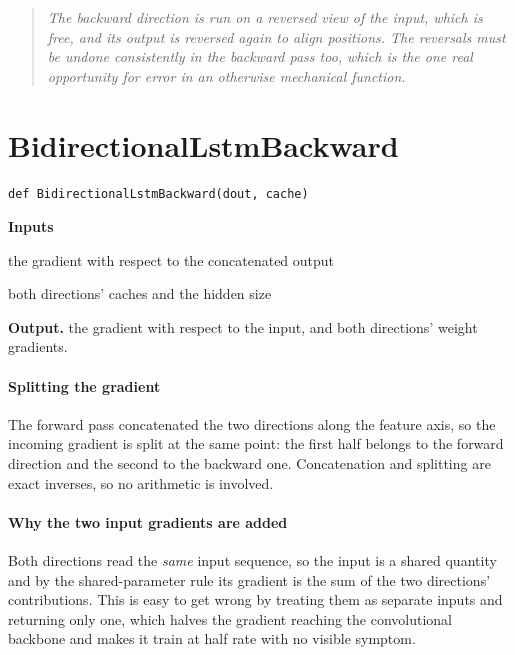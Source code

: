 \begin{quote}\small\itshape The backward direction is run on a reversed view of the input, which is free, and its output is reversed again to align positions. The reversals must be undone consistently in the backward pass too, which is the one real opportunity for error in an otherwise mechanical function.\end{quote}

\section{BidirectionalLstmBackward}
\begin{lstlisting}[style=sig]
def BidirectionalLstmBackward(dout, cache)
\end{lstlisting}

\noindent\textbf{Inputs}
\begin{description}[leftmargin=2.2em,style=nextline,font=\normalfont\ttfamily]\setlength\itemsep{1pt}
  \item[{dout}] \normalfont the gradient with respect to the concatenated output
  \item[{cache}] \normalfont both directions' caches and the hidden size
\end{description}

\noindent\textbf{Output.} the gradient with respect to the input, and both directions' weight gradients.


\paragraph{Splitting the gradient}
The forward pass concatenated the two directions along the feature axis, so the incoming gradient is split at the same point: the first half belongs to the forward direction and the second to the backward one. Concatenation and splitting are exact inverses, so no arithmetic is involved.


\paragraph{Why the two input gradients are added}
Both directions read the \emph{same} input sequence, so the input is a shared quantity and by the shared-parameter rule its gradient is the sum of the two directions' contributions. This is easy to get wrong by treating them as separate inputs and returning only one, which halves the gradient reaching the convolutional backbone and makes it train at half rate with no visible symptom.


